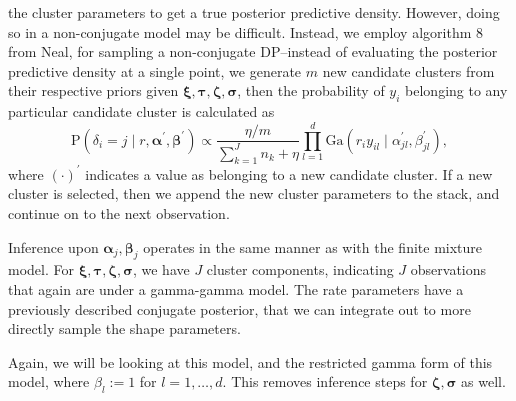   the cluster parameters to get a true posterior predictive density.  However, doing so in a
  non-conjugate model may be difficult.  Instead, we employ algorithm 8 from Neal\cite{neal2000},
  for sampling a non-conjugate DP--instead of evaluating the posterior predictive density at a
  single point, we generate $m$ new candidate clusters from their respective priors given
  $\bm{ \xi,\tau,\zeta,\sigma}$, then the probability of $y_i$ belonging to any particular candidate
  cluster is calculated as
  \begin{equation}
    \label{eqn:dpdeltanew}
    \text{P}\left(\delta_i = j\mid r, \bm{ \alpha}^{\prime}, \bm{ \beta}^{\prime}\right) \propto
        \frac{\eta / m}{\sum_{k = 1}^{J} n_k + \eta}
        {\displaystyle\prod}_{l = 1}^d\text{Ga}\left(r_iy_{il}\mid\alpha_{jl}^{\prime},\beta_{jl}^{\prime}\right),
  \end{equation}
  where $(\cdot)^{\prime}$ indicates a value as belonging to a new candidate cluster.  If a new cluster
  is selected, then we append the new cluster parameters to the stack, and continue on to the next
  observation.

Inference upon $\bm{ \alpha}_j,\bm{ \beta}_j$ operates in the same manner as with the finite mixture
  model.  For $\bm{ \xi,\tau,\zeta,\sigma}$, we have $J$ cluster components, indicating $J$
  observations that again are under a gamma-gamma model.  The rate parameters have a previously
  described conjugate posterior, that we can integrate out to more directly sample the shape
  parameters.

Again, we will be looking at this model, and the restricted gamma form of this model, where
  $\beta_l := 1$ for $l = 1,\ldots,d$.  This removes inference steps for $\bm{ \zeta},\bm{ \sigma}$
  as well.

